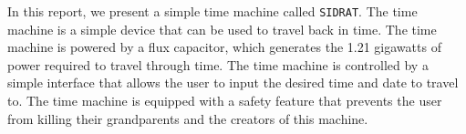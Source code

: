 In this report, we present a simple time machine called \texttt{SIDRAT}. The time machine is a simple device that can be used to travel back in time. The time machine is powered by a flux capacitor, which generates the 1.21 gigawatts of power required to travel through time. The time machine is controlled by a simple interface that allows the user to input the desired time and date to travel to. The time machine is equipped with a safety feature that prevents the user from killing their grandparents and the creators of this machine.